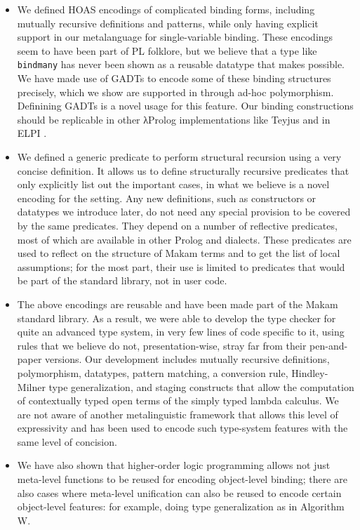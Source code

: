 \begin{itemize}
\item
  We defined HOAS encodings of complicated binding forms, including
  mutually recursive definitions and patterns, while only having
  explicit support in our metalanguage for single-variable binding.
  These encodings seem to have been part of PL folklore, but we believe
  that a type like \texttt{bindmany} has never been shown as a reusable
  datatype that \lamprolog makes possible. We have made use of GADTs to
  encode some of these binding structures precisely, which we show are
  supported in \lamprolog through ad-hoc polymorphism. Definining GADTs
  is a novel usage for this \lamprolog feature. Our binding
  constructions should be replicable in other \foreignlanguage{greek}{λ}Prolog implementations
  like Teyjus \citep{teyjus-main-reference,teyjus-2-implementation} and
  in ELPI \citep{elpi-main-reference}.
\item
  We defined a generic predicate to perform structural recursion using a
  very concise definition. It allows us to define structurally recursive
  predicates that only explicitly list out the important cases, in what
  we believe is a novel encoding for the \lamprolog
   setting. Any new definitions, such as constructors or datatypes we
  introduce later, do not need any special provision to be covered by
  the same predicates. They depend on a number of reflective predicates,
  most of which are available in other Prolog and \lamprolog dialects.
  These predicates are used to reflect on the structure of Makam terms
  and to get the list of local assumptions; for the most part, their use
  is limited to predicates that would be part of the standard library,
  not in user code.
\item
  The above encodings are reusable and have been made part of the Makam
  standard library. As a result, we were able to develop the type
  checker for quite an advanced type system, in very few lines of code
  specific to it, using rules that we believe do not, presentation-wise,
  stray far from their pen-and-paper versions. Our development includes
  mutually recursive definitions, polymorphism, datatypes, pattern
  matching, a conversion rule, Hindley-Milner type generalization, and
  staging constructs that allow the computation of contextually typed
  open terms of the simply typed lambda calculus. We are not aware of
  another metalinguistic framework that allows this level of
  expressivity and has been used to encode such type-system features
  with the same level of concision.
\item
  We have also shown that higher-order logic programming allows not just
  meta-level functions to be reused for encoding object-level binding;
  there are also cases where meta-level unification can also be reused
  to encode certain object-level features: for example, doing type
  generalization as in Algorithm W.
\end{itemize}

